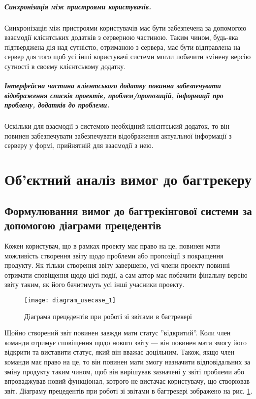 \documentclass[../main.tex]{subfiles}
\begin{document}
	\subparagraph{Синхронізація між пристроями користувачів.}
		Синхронізація між пристроями користувачів має бути забезпечена за допомогою взаємодії клієнтських додатків з серверною частиною. Таким чином, будь-яка підтверджена дія над сутністю, отриманою з сервера, має бути відправлена на сервер для того щоб усі інші користувачі системи могли побачити змінену версію сутності в своєму клієнтському додатку.
	
	\subparagraph{Інтерфейсна частина клієнтського додатку повинна забезпечувати відображення списків проектів, проблем/пропозицій, інформації про проблему, додатків до проблеми.}
		Оскільки для взаємодії з системою необхідний клієнтський додаток, то він повинен забезпечувати забезпечувати відображення актуальної інформації з серверу у формі, прийнятній для взаємодії з нею.

\section{Об'єктний аналіз вимог до багтрекеру}

	\subsection{Формулювання вимог до багтрекінгової системи за допомогою діаграми прецедентів}
		Кожен користувач, що в рамках проекту має право на це, повинен мати можливість створення звіту щодо проблеми або пропозіції з покращення продукту. Як тільки створення звіту завершено, усі члени проекту повинні отримати сповіщення щодо цієї події, а сам автор має побачити фінальну версію звіту таким, як його бачитимуть усі інші учасники проекту.
		
		\begin{figure}[H]
			\centering
			\texttt{[image: diagram\_usecase\_1]}
			\caption{Діаграма прецедентів при роботі зі звітами в багтрекері}
			\label{diag_usecase}
		\end{figure}
		
		Щойно створений звіт повинен завжди мати статус ''відкритий''. Коли член команди отримує сповіщення щодо нового звіту — він повинен мати змогу його відкрити та виставити статус, який він вважає доцільним. Також, якщо член команди має право на це, то він повинен мати змогу назначити відповідальних за зміну продукту таким чином, щоб він вирішував зазначені у звіті проблеми або впроваджував новий функціонал, котрого не вистачає користувачу, що створював звіт. Діаграму прецедентів при роботі зі звітами в багтрекері зображено на рис. \ref{diag_usecase}.
		
\end{document}
